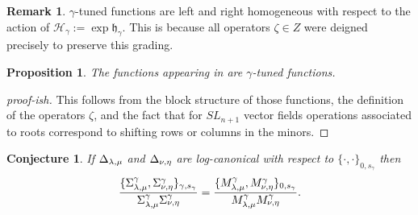 \documentclass[a4paper]{amsart}
\newtheorem{proposition}[theorem]{Proposition}
\newtheorem{conjecture}[theorem]{Conjecture}
\theoremstyle{definition}
\newtheorem{remark}[theorem]{Remark}
\newcommand{\mfh}{\mathfrak{h}}
\newcommand{\mcH}{\mathcal{H}}
\begin{document}
\begin{remark}
  $\gamma$-tuned functions are left and right homogeneous with respect to the action of $\mcH_\gamma:=\exp\mfh_\gamma$.
  This is because all operators $\zeta\in Z$ were deigned precisely to preserve this grading.
\end{remark}

\begin{proposition}
  The functions appearing in \cite{GSV19} are $\gamma$-tuned functions.
\end{proposition}
\begin{proof}[proof-ish]
  This follows from the block structure of those functions, the definition of the operators $\zeta$, and the fact that for $SL_{n+1}$ vector fields operations associated to roots correspond to shifting rows or columns in the minors. 
\end{proof}

\begin{conjecture}
  \label{conj: bracket comparison}
  If $\minor[\lambda][\mu]$ and $\minor[\nu][\eta]$ are log-canonical with respect to $\{\cdot,\cdot\}_{0,s_\gamma}$ then
  \[
    \frac{\{\function[\lambda][\mu],\function[\nu][\eta]\}_{\gamma,s_\gamma}}{\function[\lambda][\mu] \function[\nu][\eta]} 
    = 
    \frac{\{\monomial[\lambda][\mu],\monomial[\nu][\eta]\}_{0,s_\gamma}}{\monomial[\lambda][\mu] \monomial[\nu][\eta]}.
  \]
\end{conjecture}
\end{document}

